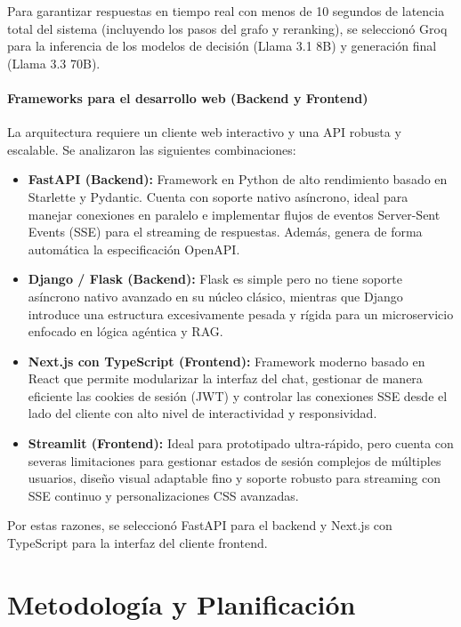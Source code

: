 \documentclass[12pt,a4paper,oneside]{report}
\begin{document}
Para garantizar respuestas en tiempo real con menos de 10 segundos de latencia total del sistema (incluyendo los pasos del grafo y reranking), se seleccionó Groq para la inferencia de los modelos de decisión (Llama 3.1 8B) y generación final (Llama 3.3 70B).

\subsection*{Frameworks para el desarrollo web (Backend y Frontend)}

La arquitectura requiere un cliente web interactivo y una API robusta y escalable. Se analizaron las siguientes combinaciones:
\begin{itemize}
    \item \textbf{FastAPI (Backend):} Framework en Python de alto rendimiento basado en Starlette y Pydantic. Cuenta con soporte nativo asíncrono, ideal para manejar conexiones en paralelo e implementar flujos de eventos Server-Sent Events (SSE) para el streaming de respuestas. Además, genera de forma automática la especificación OpenAPI.
    \item \textbf{Django / Flask (Backend):} Flask es simple pero no tiene soporte asíncrono nativo avanzado en su núcleo clásico, mientras que Django introduce una estructura excesivamente pesada y rígida para un microservicio enfocado en lógica agéntica y RAG.
    \item \textbf{Next.js con TypeScript (Frontend):} Framework moderno basado en React que permite modularizar la interfaz del chat, gestionar de manera eficiente las cookies de sesión (JWT) y controlar las conexiones SSE desde el lado del cliente con alto nivel de interactividad y responsividad.
    \item \textbf{Streamlit (Frontend):} Ideal para prototipado ultra-rápido, pero cuenta con severas limitaciones para gestionar estados de sesión complejos de múltiples usuarios, diseño visual adaptable fino y soporte robusto para streaming con SSE continuo y personalizaciones CSS avanzadas.
\end{itemize}

Por estas razones, se seleccionó FastAPI para el backend y Next.js con TypeScript para la interfaz del cliente frontend.

\part{Metodología y Planificación}
\end{document}

